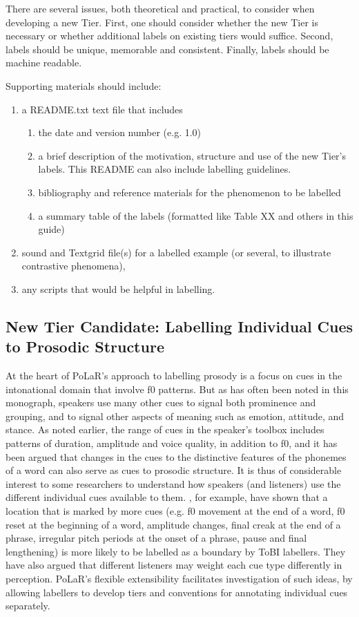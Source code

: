 There are several issues, both theoretical and practical, to consider when developing a new Tier. First, one should consider whether the new Tier is necessary or whether additional labels on existing tiers would suffice. Second, labels should be unique,  memorable and consistent. Finally, labels should be machine readable. 

Supporting materials should include:
\begin{enumerate}
	\item a README.txt text  file that includes
	\begin{enumerate}
		\item the date and version number (e.g. 1.0) 
		\item a brief description of the motivation, structure  and use of the new Tier’s labels. This README can also include labelling guidelines.
		\item bibliography and reference materials for the phenomenon to be labelled
		\item a summary table of the labels (formatted like Table XX and others in this guide)
	\end{enumerate}
	\item sound and Textgrid file(s) for a labelled example (or several, to illustrate contrastive phenomena),
	\item any scripts that would be helpful in labelling. 
\end{enumerate}

\subsection{New Tier Candidate: Labelling Individual Cues to Prosodic Structure}\label{sec:labelling-individual-cues}
At the heart of PoLaR’s approach to labelling prosody is a focus on cues in the intonational domain that involve f0 patterns.  But as has often been noted in this monograph, speakers use many other cues to signal both prominence and grouping, and to signal other aspects of meaning such as emotion, attitude, and stance. As noted earlier, the range of cues in the speaker’s toolbox includes patterns of duration, amplitude and voice quality, in addition to f0, and it has been argued that changes in the cues to the distinctive features of the phonemes of a word can also serve as cues to prosodic structure. It is thus of considerable interest to some researchers to understand how speakers (and listeners) use the different individual cues available to them.  \citet{brugos-18}, for example, have shown that a location that is marked by more cues (e.g. f0 movement at the end of a word, f0 reset at the beginning of a word, amplitude changes, final creak at the end of a phrase, irregular pitch periods at the onset of a phrase, pause and final lengthening) is more likely to be labelled as a boundary by ToBI labellers.  They have also argued that different listeners may weight each cue type differently in perception. PoLaR’s flexible extensibility facilitates investigation of such ideas, by allowing labellers to develop tiers and conventions for annotating individual cues separately. 

